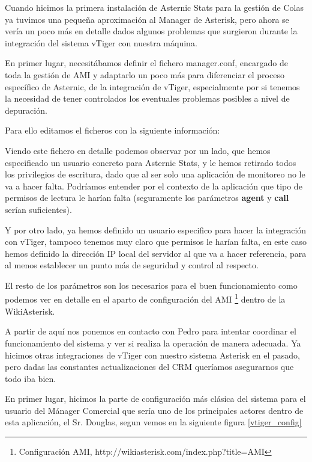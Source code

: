 {Cuando hicimos la primera instalación de Asternic Stats para la gestión de Colas ya tuvimos una pequeña aproximación al Manager de Asterisk, pero ahora se vería un poco más en detalle dados algunos problemas que surgieron durante la integración del sistema vTiger con nuestra máquina.

En primer lugar, necesitábamos definir el fichero manager.conf, encargado de toda la gestión de AMI y adaptarlo un poco más para diferenciar el proceso específico de Asternic, de la integración de vTiger, especialmente por si tenemos la necesidad de tener controlados los eventuales problemas posibles a nivel de depuración.

Para ello editamos el ficheros con la siguiente información:



Viendo este fichero en detalle podemos observar por un lado, que hemos especificado un usuario concreto para Asternic Stats, y le hemos retirado todos los privilegios de escritura, dado que al ser solo una aplicación de monitoreo no le va a hacer falta. Podríamos entender por el contexto de la aplicación que tipo de permisos de lectura le harían falta (seguramente los parámetros \textbf{agent} y \textbf{call} serían suficientes).

Y por otro lado, ya hemos definido un usuario especifico para hacer la integración con vTiger, tampoco tenemos muy claro que permisos le harían falta, en este caso hemos definido la dirección IP local del servidor al que va a hacer referencia, para al menos establecer un punto más de seguridad y control al respecto.

El resto de los parámetros son los necesarios para el buen funcionamiento como podemos ver en detalle en el aparto de configuración del AMI \footnote{Configuración AMI, http://wikiasterisk.com/index.php?title=AMI} dentro de la WikiAsterisk.

A partir de aquí nos ponemos en contacto con Pedro para intentar coordinar el funcionamiento del sistema y ver si realiza la operación de manera adecuada. Ya hicimos otras integraciones de vTiger con nuestro sistema Asterisk en el pasado, pero dadas las constantes actualizaciones del CRM queríamos asegurarnos que todo iba bien.

En primer lugar, hicimos la parte de configuración más clásica del sistema para el usuario del Mánager Comercial que sería uno de los principales actores dentro de esta aplicación, el Sr. Douglas, segun vemos en la siguiente figura \ref{vtiger_config}

}
